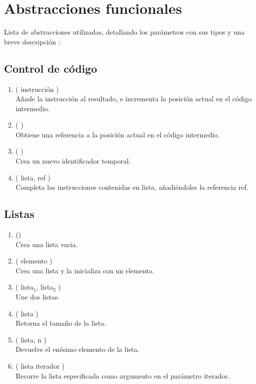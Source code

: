 
\chapter{Abstracciones funcionales}

Lista de abstracciones utilizadas, detallando los parámetros con sus tipos y una breve 
descripción :

\section{Control de código}

\begin{enumerate}
	\item {} ( instrucción ) \\
			Añade la instrucción al resultado, e incrementa la posición actual en el código intermedio.
			
	\item {} ( ) \\
			Obtiene una referencia a la posición actual en el código intermedio.
	
	\item {} ( ) \\
			Crea un nuevo identificador temporal.

	\item {} ( lista, ref ) \\
			Completa las instrucciones contenidas en lista, añadiéndoles la referencia ref.
\end{enumerate}

\section{Listas}

\begin{enumerate}
	\item {} () \\
			Crea una lista vacia.
			
	\item {} ( elemento ) \\
			Crea una lista y la inicializa con un elemento.
			
	\item {} ( lista$_{1}$, lista$_{2}$ ) \\
			Une dos listas.
			
	\item {} ( lista ) \\
			Retorna el tamaño de la lista.
			
	\item {} ( lista, n ) \\
			Devuelve el enésimo elemento de la lista.
	
	\item {} ( lista  iterador ) \\
			Recorre la lista especificada como argumento en el parámetro iterador.
	
\end{enumerate}

